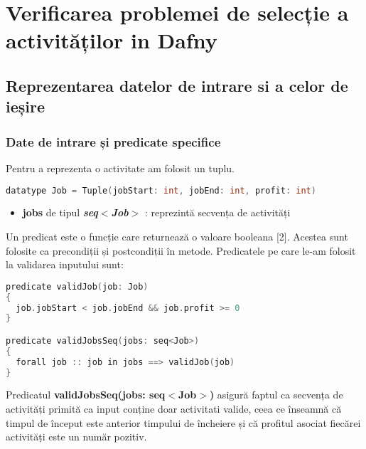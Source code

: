 
\lstset{style=mystyle}
\chapter{Verificarea problemei de selecție a activităților in Dafny}

\section{Reprezentarea datelor de intrare si a celor de ieșire}
\subsection{Date de intrare și predicate specifice }

Pentru a reprezenta o activitate am folosit un tuplu. 
\begin{lstlisting}[language=C++]
    datatype Job = Tuple(jobStart: int, jobEnd: int, profit: int)
\end{lstlisting}
\begin{itemize}
    \item \textbf{jobs} de tipul \textbf{\textit{seq$<$Job$>$}} : reprezintă secvența de activități 
\end{itemize}
Un predicat este o funcție care returnează o valoare booleana [2]. Acestea sunt folosite ca precondiții și postcondiții în metode. Predicatele pe care le-am folosit la validarea inputului sunt:

\begin{lstlisting}[language=C++]
predicate validJob(job: Job)
{
  job.jobStart < job.jobEnd && job.profit >= 0
}

predicate validJobsSeq(jobs: seq<Job>)
{
  forall job :: job in jobs ==> validJob(job)
}
\end{lstlisting}
Predicatul \textbf{validJobsSeq(jobs: seq$<$Job$>$)} asigură faptul ca secvența de activități primită ca input conține doar activitati valide, ceea ce înseamnă că timpul de început este anterior timpului de încheiere și că profitul asociat fiecărei activități este un număr pozitiv.

